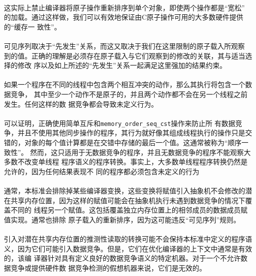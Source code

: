 \paragraph{}
\notes 这实际上禁止编译器将原子操作重新排序到单个对象，即使两个操作都是``宽松''
的加载。通过这样做，我们可以有效地保证由C原子操作可用的大多数硬件提供的``缓存一
致性''。

\paragraph{}
\notes 可见序列取决于``先发生''关系，而这又取决于我们在这里限制的原子载入所观察
到的值。正确的理解是必须存在原子载入与它们观察到的修改的关联，其与适当选择的修改
序以及如上所述的``先发生''关系一起满足这里强加的结果约束。

\paragraph{}
如果一个程序在不同的线程中包含两个相互冲突的动作，那么其执行将包含一个数据竞争，
其中至少一个动作不是原子的，并且两个动作都不会在另一个线程之前发生。任何这样的数
据竞争都会导致未定义行为。

\paragraph{}
\notes 可以证明，正确使用简单互斥和\texttt{memory\_order\_seq\_cst}操作来防止所
有数据竞争，并且不使用其他同步操作的程序，其行为就好像其组成线程执行的操作只是交
错的，对象的每个值计算都是在交错中存储的最后一个值。这通常被称为“顺序一致性”。
然而，这只适用于无数据竞争的程序，并且无数据竞争的程序不能观察大多数不改变单线程
程序语义的程序转换。事实上，大多数单线程程序转换仍然是允许的，因为任何结果表现不
同的程序都必须包含未定义的行为

\paragraph{}
\notes 通常，本标准会排除掉某些编译器变换，这些变换将赋值引入抽象机不会修改的潜
在共享内存位置，因为这样的赋值可能会在抽象机执行未遇到数据竞争的情况下覆盖不同的
线程另一个赋值。这包括覆盖独立内存位置上的相邻成员的数据成员赋值实现。通常也排除
原子载入的重新排序，因为这可能违反``可见序列''规则。

\paragraph{}
\notes 引入对潜在共享内存位置的推测性读取的转换可能不会保持本标准中定义的程序语
义，因为它们可能引入数据竞争。但是，它们在优化编译器的上下文中通常是有效的，该编
译器针对具有定义良好的数据竞争语义的特定机器。对于一个不允许数据竞争或提供硬件数
据竞争检测的假想机器来说，它们是无效的。

